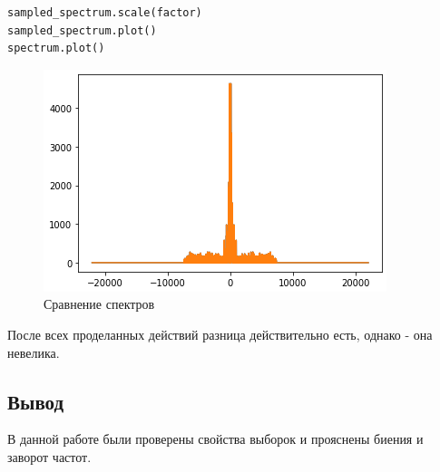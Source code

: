 \begin{lstlisting}[language=Python]
sampled_spectrum.scale(factor)
sampled_spectrum.plot()
spectrum.plot()
\end{lstlisting}
\begin{figure}[H]
	\begin{center}
		\includegraphics[scale=1]{fig/lab11/lab11_7.png}
		\caption{Сравнение спектров}
	\end{center}
\end{figure}

После всех проделанных действий разница действительно есть, однако - она невелика.

\subsection{Вывод}

В данной работе были проверены свойства выборок и прояснены биения и заворот частот.